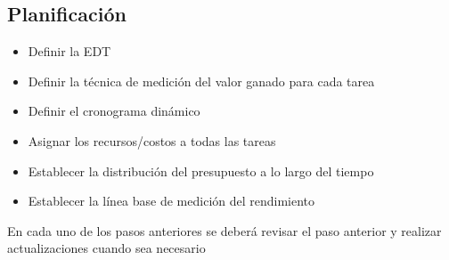 \documentclass{article}
\begin{document}
        \subsection{Planificación}
        \begin{itemize}
    \item Definir la EDT
    \item Definir la técnica de medición del valor ganado para cada tarea
    \item Definir el cronograma dinámico
    \item Asignar los recursos/costos a todas las tareas
    \item Establecer la distribución del presupuesto a lo largo del tiempo
    \item Establecer la línea base de medición del rendimiento
        \end{itemize}
    En cada uno de los pasos anteriores se deberá revisar el paso anterior y realizar actualizaciones cuando sea necesario
\end{document}

